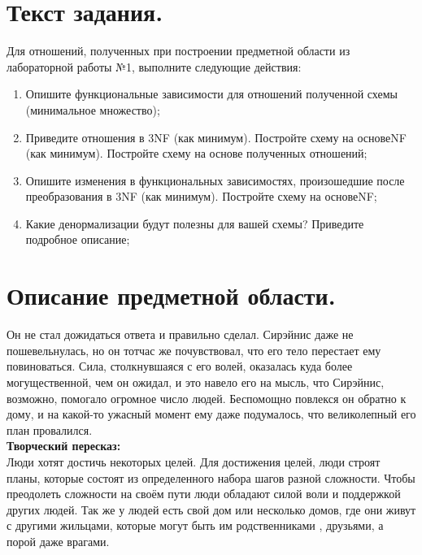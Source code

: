 \documentclass[12pt,onecolumn]{article}
\begin{document}
\section{Текст задания.}
Для отношений, полученных при построении предметной области из
лабораторной работы №1, выполните следующие действия:
\begin{enumerate}
  \item Опишите функциональные зависимости для отношений полученной схемы (минимальное множество);
  \item Приведите отношения в 3NF (как минимум). Постройте схему на основеNF (как минимум). Постройте схему на основе
  полученных отношений;
  \item Опишите изменения в функциональных зависимостях, произошедшие после преобразования в 3NF (как минимум). Постройте схему на основеNF;
  \item Какие денормализации будут полезны для вашей схемы? Приведите
  подробное описание;
\end{enumerate}
\section{Описание предметной области.}
Он не стал дожидаться ответа и правильно сделал. Сирэйнис даже не пошевельнулась, но он тотчас же почувствовал, что его тело перестает ему повиноваться. Сила, столкнувшаяся с его волей, оказалась куда более могущественной, чем он ожидал, и это навело его на мысль, что Сирэйнис, возможно, помогало огромное число людей. Беспомощно повлекся он обратно к дому, и на какой-то ужасный момент ему даже подумалось, что великолепный его план провалился.\\
\textbf{Творческий пересказ:}\\
Люди хотят достичь некоторых целей. Для достижения целей, люди строят планы, которые состоят из определенного набора шагов разной сложности. Чтобы преодолеть сложности на своём пути люди обладают силой воли и поддержкой других людей. Так же у людей есть свой дом или несколько домов, где они живут с другими жильцами, которые могут быть им родственниками , друзьями, а порой даже врагами. 
\end{document}
